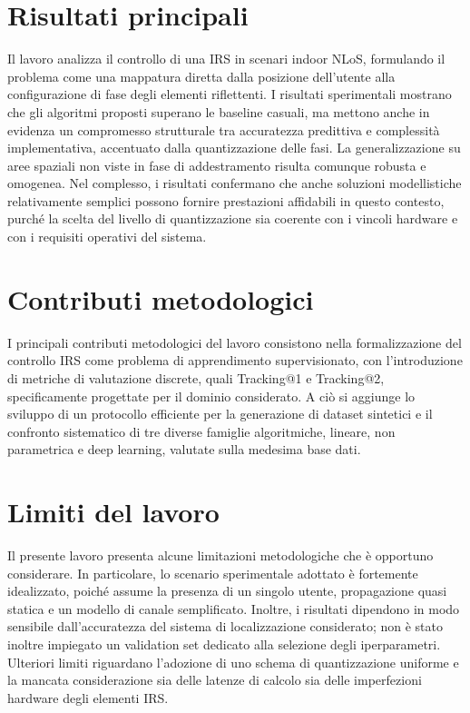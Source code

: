 \documentclass[12pt,a4paper]{report}
\begin{document}
\section{Risultati principali}
Il lavoro analizza il controllo di una IRS in scenari indoor NLoS,
formulando il problema come una mappatura diretta dalla posizione
dell'utente alla configurazione di fase degli elementi riflettenti. I
risultati sperimentali mostrano che gli algoritmi proposti superano
le baseline casuali, ma mettono anche in evidenza un compromesso
strutturale tra accuratezza predittiva e complessità implementativa,
accentuato dalla quantizzazione delle fasi. La generalizzazione su
aree spaziali non viste in fase di addestramento risulta comunque
robusta e omogenea. Nel complesso, i risultati confermano che anche
soluzioni modellistiche relativamente semplici possono fornire
prestazioni affidabili in questo contesto, purché la scelta del
livello di quantizzazione sia coerente con i vincoli hardware e con i
requisiti operativi del sistema.

\section{Contributi metodologici}
I principali contributi metodologici del lavoro consistono nella
formalizzazione del controllo IRS come problema di apprendimento
supervisionato, con l'introduzione di metriche di valutazione
discrete, quali Tracking@1 e Tracking@2, specificamente progettate
per il dominio considerato. A ciò si aggiunge lo sviluppo di un
protocollo efficiente per la generazione di dataset sintetici e il
confronto sistematico di tre diverse famiglie algoritmiche, lineare,
non parametrica e deep learning, valutate sulla medesima base dati.

\section{Limiti del lavoro}
Il presente lavoro presenta alcune limitazioni metodologiche che è
opportuno considerare. In particolare, lo scenario sperimentale
adottato è fortemente idealizzato, poiché assume la presenza di un
singolo utente, propagazione quasi statica e un modello di canale
semplificato. Inoltre, i risultati dipendono in modo sensibile
dall'accuratezza del sistema di localizzazione considerato; non è
stato inoltre impiegato un validation set dedicato alla selezione
degli iperparametri. Ulteriori limiti riguardano l'adozione di uno
schema di quantizzazione uniforme e la mancata considerazione sia
delle latenze di calcolo sia delle imperfezioni hardware degli elementi IRS.
\end{document}
